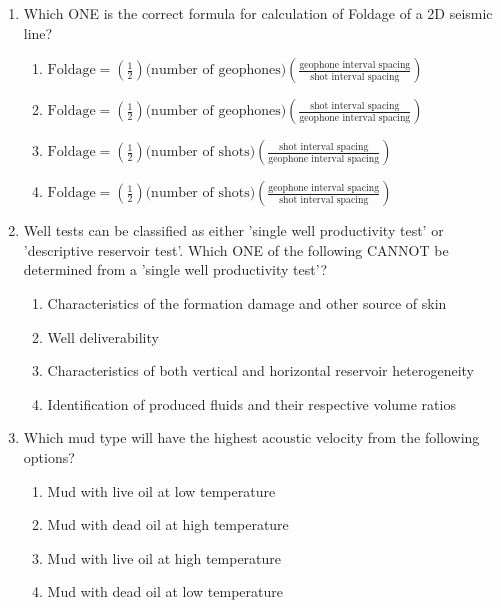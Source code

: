 \documentclass[journal,12pt,onecolumn]{IEEEtran}
\theoremstyle{remark}
\begin{document}
\begin{enumerate}
 \item Which ONE is the correct formula for calculation of Foldage of a 2D seismic line?
\begin{enumerate}
    \item $\text{Foldage} = \left(\frac{1}{2}\right) \text{(number of geophones)} \left(\frac{\text{geophone interval spacing}}{\text{shot interval spacing}}\right)$
    \item $\text{Foldage} = \left(\frac{1}{2}\right) \text{(number of geophones)} \left(\frac{\text{shot interval spacing}}{\text{geophone interval spacing}}\right)$
    \item $\text{Foldage} = \left(\frac{1}{2}\right) \text{(number of shots)} \left(\frac{\text{shot interval spacing}}{\text{geophone interval spacing}}\right)$
    \item $\text{Foldage} = \left(\frac{1}{2}\right) \text{(number of shots)} \left(\frac{\text{geophone interval spacing}}{\text{shot interval spacing}}\right)$
\end{enumerate}
\hfill{}



\item  Well tests can be classified as either 'single well productivity test' or 'descriptive reservoir test'. Which ONE of the following CANNOT be determined from a 'single well productivity test'?
\begin{enumerate}
    \item Characteristics of the formation damage and other source of skin
    \item Well deliverability
    \item Characteristics of both vertical and horizontal reservoir heterogeneity
    \item Identification of produced fluids and their respective volume ratios
\end{enumerate}
\hfill{}



\item  Which mud type will have the highest acoustic velocity from the following options?
\begin{enumerate}
    \item Mud with live oil at low temperature
    \item Mud with dead oil at high temperature
    \item Mud with live oil at high temperature
    \item Mud with dead oil at low temperature
\end{enumerate}
\hfill{}




\end{enumerate}
\end{document}

